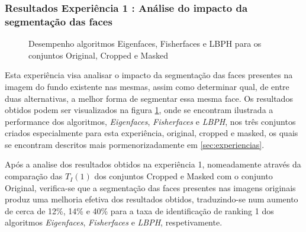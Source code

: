 \subsubsection{Resultados Experiência 1 : Análise do impacto da segmentação das faces}

\begin{figure}[h]

        \caption{Desempenho algoritmos Eigenfaces, Fisherfaces e LBPH para os conjuntos Original, Cropped e Masked}
        \label{fig:original_cropped_masked}
\end{figure}

Esta experiência visa analisar o impacto da segmentação das faces presentes na imagem do fundo existente nas mesmas, assim como determinar qual, de entre duas alternativas, a melhor forma de segmentar essa mesma face. Os resultados obtidos podem ser visualizados na figura \ref{fig:original_cropped_masked}, onde se encontram ilustrada a performance dos algoritmos, \textit{Eigenfaces}, \textit{Fisherfaces} e \textit{LBPH}, nos três conjuntos criados especialmente para esta experiência, original, cropped e masked, os quais se encontram descritos mais pormenorizadamente em \ref{sec:experiencias}.

Após a analise dos resultados obtidos na experiência 1, nomeadamente através da comparação das $T_{I}(1)$ dos conjuntos Cropped e Masked com o conjunto Original, verifica-se que a segmentação das faces presentes nas imagens originais produz uma melhoria efetiva dos resultados obtidos, traduzindo-se num aumento de cerca de 12\%, 14\% e 40\% para a taxa de identificação de ranking 1 dos algoritmos \textit{Eigenfaces}, \textit{Fisherfaces} e \textit{LBPH}, respetivamente.

